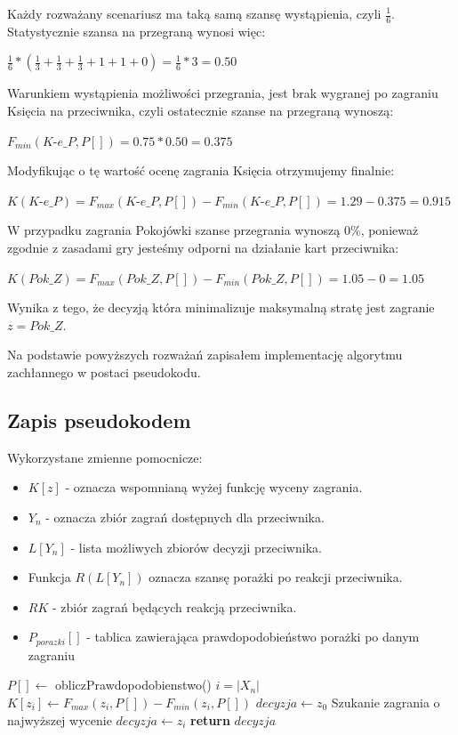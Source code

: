 Każdy rozważany scenariusz ma taką samą szansę wystąpienia, czyli $\frac{1}{6}$. Statystycznie szansa na przegraną wynosi więc:
\begin{center}
 $\frac{1}{6} * (\frac{1}{3} + \frac{1}{3} + \frac{1}{3} + 1 + 1 + 0) = \frac{1}{6} * 3 = 0.50 $
\end{center}
Warunkiem wystąpienia możliwości przegrania, jest brak wygranej po zagraniu Księcia na przeciwnika, czyli ostatecznie szanse na przegraną wynoszą:
\begin{center}
	$F_{min}(\textit{K-e\_P}, P[]) = 0.75 * 0.50 = 0.375$
\end{center}
Modyfikując o tę wartość ocenę zagrania Księcia otrzymujemy finalnie:
\begin{center}
	$K(\textit{K-e\_P}) =  F_{max}(\textit{K-e\_P}, P[]) - F_{min}(\textit{K-e\_P}, P[]) = 1.29 - 0.375 = 0.915$
\end{center} 
W przypadku zagrania Pokojówki szanse przegrania wynoszą 0\%, ponieważ zgodnie z zasadami gry jesteśmy odporni na działanie kart przeciwnika:
\begin{center}
	$K(Pok\_Z) =  F_{max}(Pok\_Z, P[]) - F_{min}(Pok\_Z, P[]) = 1.05 - 0 = 1.05$
\end{center} 
Wynika z tego, że decyzją która minimalizuje maksymalną stratę jest zagranie $z = Pok\_Z$.

Na podstawie powyższych rozważań zapisałem implementację algorytmu zachłannego w postaci pseudokodu.
\subsection{Zapis pseudokodem}
Wykorzystane zmienne pomocnicze:
\begin{itemize}
	\item $K[z]$ - oznacza wspomnianą wyżej funkcję wyceny zagrania. 
	\item $Y_n$ - oznacza zbiór zagrań dostępnych dla przeciwnika.
	\item $L[Y_n]$ - lista możliwych zbiorów decyzji przeciwnika.
	\item Funkcja $R(L[Y_n])$ oznacza szansę porażki po reakcji przeciwnika.
	\item $RK$ - zbiór zagrań będących reakcją przeciwnika.
	\item $P_{porazki}[]$ - tablica zawierająca prawdopodobieństwo porażki po danym zagraniu
\end{itemize}

\begin{algorithmic}[1]
	\State $P[] \gets$ obliczPrawdopodobienstwo()
		 \Comment $i=|X_n|$
			\State $K[z_i] \gets F_{max}(z_i, P[]) - F_{min}(z_i, P[])$
		\EndFor		
		\State $ decyzja \gets z_0$ \Comment Szukanie zagrania o najwyższej wycenie
				\State $decyzja \gets z_i$
			\EndIf
		\EndFor		
		\State \textbf{return} $decyzja$
	\EndFunction
\end{algorithmic}


